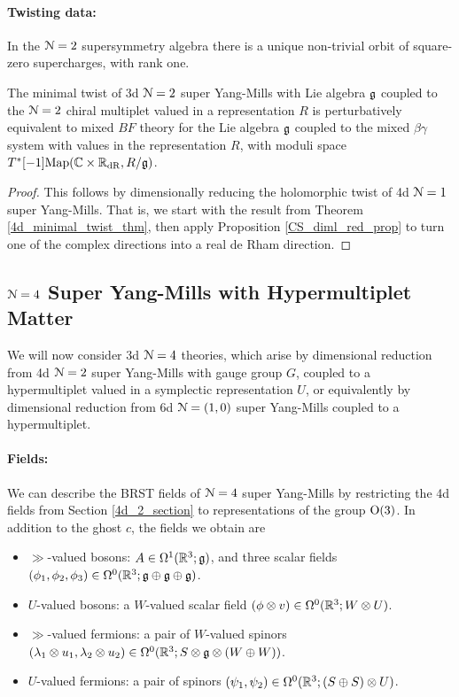 \documentclass[10pt, oneside]{article}
\begin{document}
\vspace{-10pt}
\paragraph{Twisting data:}
In the $\mathcal{N}=2$ supersymmetry algebra there is a unique non-trivial orbit of square-zero supercharges, with rank one. 

\begin{thm} \label{3d_minimal_twist_thm}
The minimal twist of 3d $\mathcal N=2$ super Yang-Mills with Lie algebra $\mathfrak g$ coupled to the $\mathcal N=2$ chiral multiplet valued in a representation $R$ is perturbatively equivalent to mixed $BF$ theory for the Lie algebra $\mathfrak g$ coupled to the mixed $\beta\gamma$ system with values in the representation $R$, with moduli space $T^*[-1]\mathrm{Map}(\mathbb C \times \mathbb R_{\mathrm{dR}}, R/\mathfrak{g})$. 
\end{thm}

\begin{proof}
This follows by dimensionally reducing the holomorphic twist of 4d $\mathcal{N}=1$ super Yang-Mills.  That is, we start with the result from Theorem \ref{4d_minimal_twist_thm}, then apply Proposition \ref{CS_diml_red_prop} to turn one of the complex directions into a real de Rham direction.
\end{proof}

\subsection{\texorpdfstring{$\mathcal N = 4$}{N=4} Super Yang-Mills with Hypermultiplet Matter} \label{3d_4_section}
We will now consider 3d $\mathcal{N}=4$ theories, which arise by dimensional reduction from 4d $\mathcal{N}=2$ super Yang-Mills with gauge group $G$, coupled to a hypermultiplet valued in a symplectic representation $U$, or equivalently by dimensional reduction from 6d $\mathcal{N}=(1,0)$ super Yang-Mills coupled to a hypermultiplet.

\vspace{-10pt}
\paragraph{Fields:} We can describe the BRST fields of $\mathcal{N}=4$ super Yang-Mills by restricting the 4d fields from Section \ref{4d_2_section} to representations of the group $\mathrm{O}(3)$.  In addition to the ghost $c$, the fields we obtain are
\begin{itemize}
 \item $\gg$-valued bosons: $A \in \Omega^1(\mathbb R^3; \mathfrak{g})$, and three scalar fields $(\phi_1,\phi_2,\phi_3) \in \Omega^0(\mathbb R^3; \mathfrak{g} \oplus \mathfrak{g} \oplus \mathfrak{g})$.
 \item $U$-valued bosons: a $W$-valued scalar field $(\phi \otimes v) \in \Omega^0(\mathbb R^3; W \otimes U)$.
 \item $\gg$-valued fermions: a pair of $W$-valued spinors $(\lambda_1 \otimes u_1, \lambda_2 \otimes u_2) \in \Omega^0(\mathbb R^3 ; S \otimes \mathfrak{g} \otimes (W \oplus W))$.
 \item $U$-valued fermions:  a pair of spinors $(\psi_1,\psi_2) \in \Omega^0(\mathbb R^3; (S\oplus S) \otimes U)$.
\end{itemize}
\end{document}
